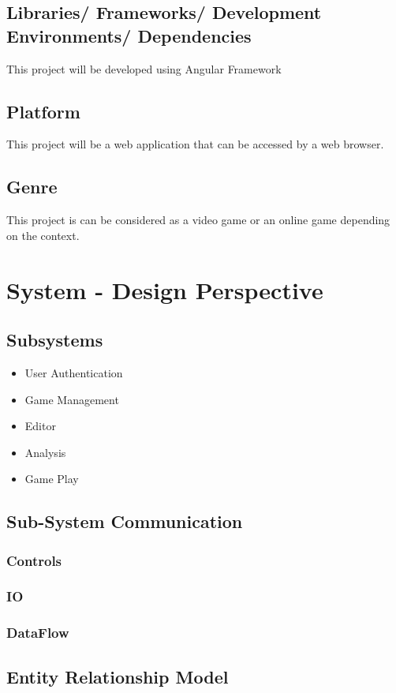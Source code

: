 \documentclass{article}
\begin{document}
\subsection{Libraries/ Frameworks/ Development Environments/ Dependencies}
This project will be developed using Angular Framework
\subsection{Platform}
This project will be a web application that can be accessed by a web browser.
\subsection{Genre}
This project is can be considered as a video game or an online game depending on the context.

\newpage
\section{System - Design Perspective}
\subsection{Subsystems}
\begin{itemize}
\item User Authentication
\item Game Management
\item Editor
\item Analysis
\item Game Play
\end{itemize}
\subsection{Sub-System Communication}
\subsubsection{Controls}
\subsubsection{IO}
\subsubsection{DataFlow}
\subsection{Entity Relationship Model}
\end{document}
